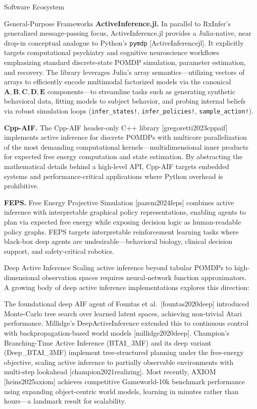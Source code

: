 \documentclass[
  ignorenonframetext,
]{beamer}
\providecommand{\citep}[1]{[#1]}
\begin{document}
\begin{frame}{Software Ecosystem}
\begin{block}{General-Purpose Frameworks}
\textbf{ActiveInference.jl.} In parallel to RxInfer's generalized
message-passing focus, ActiveInference.jl provides a Julia-native, near
drop-in conceptual analogue to Python's \texttt{pymdp}
\citep{ActiveInferencejl}. It explicitly targets computational
psychiatry and cognitive neuroscience workflows emphasizing standard
discrete-state POMDP simulation, parameter estimation, and recovery. The
library leverages Julia's array semantics---utilizing vectors of arrays
to efficiently encode multimodal factorized models via the canonical
\(\mathbf{A}, \mathbf{B}, \mathbf{C}, \mathbf{D}, \mathbf{E}\)
components---to streamline tasks such as generating synthetic behavioral
data, fitting models to subject behavior, and probing internal beliefs
via robust simulation loops (\texttt{infer\_states!},
\texttt{infer\_policies!}, \texttt{sample\_action!}).

\textbf{Cpp-AIF.} The Cpp-AIF header-only C++ library
\citep{gregoretti2023cppaif} implements active inference for discrete
POMDPs with multicore parallelization of the most demanding
computational kernels---multidimensional inner products for expected
free energy computation and state estimation. By abstracting the
mathematical details behind a high-level API, Cpp-AIF targets embedded
systems and performance-critical applications where Python overhead is
prohibitive.

\textbf{FEPS.} Free Energy Projective Simulation \citep{pazem2024feps}
combines active inference with interpretable graphical policy
representations, enabling agents to plan via expected free energy while
exposing decision logic as human-readable policy graphs. FEPS targets
interpretable reinforcement learning tasks where black-box deep agents
are undesirable---behavioral biology, clinical decision support, and
safety-critical robotics.
\end{block}

\begin{block}{Deep Active Inference}
\protect{}\label{deep-active-inference}
Scaling active inference beyond tabular POMDPs to high-dimensional
observation spaces requires neural-network function approximators. A
growing body of deep active inference implementations explores this
direction:

The foundational deep AIF agent of Fountas et
al.~\citep{fountas2020deep} introduced Monte-Carlo tree search over
learned latent spaces, achieving non-trivial Atari performance.
Millidge's DeepActiveInference extended this to continuous control with
backpropagation-based world models \citep{millidge2020deep}. Champion's
Branching-Time Active Inference (BTAI\_3MF) and its deep variant
(Deep\_BTAI\_3MF) implement tree-structured planning under the
free-energy objective, scaling active inference to partially observable
environments with multi-step lookahead \citep{champion2021realizing}.
Most recently, AXIOM \citep{heins2025axiom} achieves competitive
Gameworld-10k benchmark performance using expanding object-centric world
models, learning in minutes rather than hours---a landmark result for
scalability.
\end{block}


\end{frame}
\end{document}
